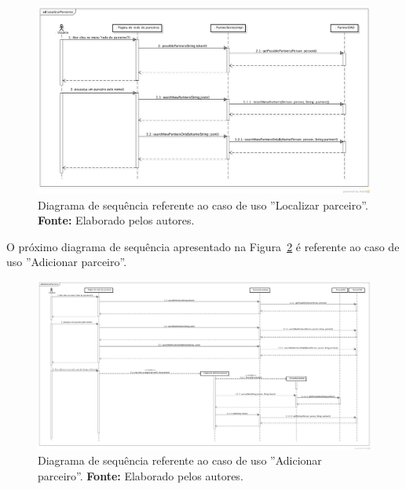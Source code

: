 \begin{landscape}
\newpage
\captionsetup[figure]{list=no}
\begin{figure}[h!]
	\centerline{\includegraphics[scale=0.45]{./imagens/apendices/diagrama-sequencia-localizar-parceiros.png}}
	\caption[Diagrama de sequência referente ao caso de uso ''Localizar parceiro''.]
	{Diagrama de sequência referente ao caso de uso ''Localizar parceiro''. \textbf{Fonte:} Elaborado pelos autores.}
	\label{fig:ap1:diagrama_sequencia_localizar_parceiro}
\end{figure}

O próximo diagrama de sequência apresentado na Figura~\ref{fig:ap1:diagrama_sequencia_adicionar_parceiro} é referente ao caso de uso ''Adicionar parceiro''.

\newpage
\captionsetup[figure]{list=no}
\begin{figure}[h!]
	\centerline{\includegraphics[scale=0.25]{./imagens/apendices/diagrama-sequencia-adicionar-parceiros.png}}
	\caption[Diagrama de sequência referente ao caso de uso ''Adicionar parceiro''.]
	{Diagrama de sequência referente ao caso de uso ''Adicionar parceiro''. \textbf{Fonte:} Elaborado pelos autores.}
	\label{fig:ap1:diagrama_sequencia_adicionar_parceiro}
\end{figure}


\end{landscape}
